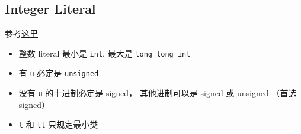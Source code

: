 \subsection{Integer Literal}
参考\href{https://en.cppreference.com/w/cpp/language/integer_literal}{这里}
\begin{itemize}
\item 整数 literal 最小是 \verb|int|, 最大是 \verb|long long int|
\item 有 \verb|u| 必定是 \verb|unsigned|
\item 没有 \verb|u| 的十进制必定是 signed， 其他进制可以是 signed 或 unsigned （首选 signed）
\item \verb|l| 和 \verb|ll| 只规定最小类
\end{itemize}
